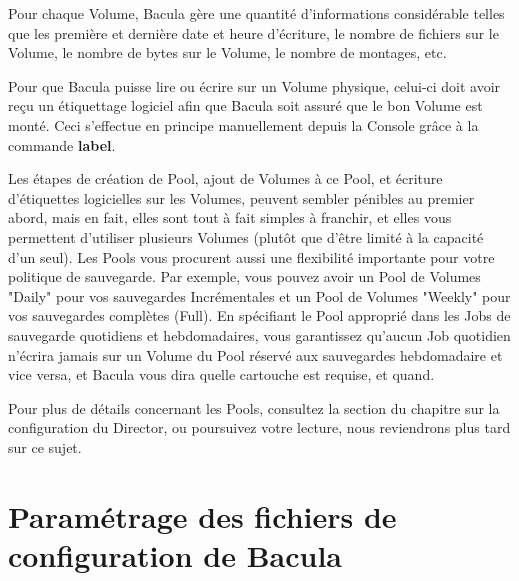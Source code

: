 Pour chaque Volume, Bacula g\`ere une quantit\'e d'informations consid\'erable
telles que les premi\`ere et derni\`ere date et heure d'\'ecriture, le nombre
de fichiers sur le Volume, le nombre de bytes sur le Volume, le nombre de
montages, etc. 

Pour que Bacula puisse lire ou \'ecrire sur un Volume physique, celui-ci doit
avoir re\c{c}u un \'etiquettage logiciel afin que Bacula soit assur\'e que le
bon Volume est mont\'e. Ceci s'effectue en principe manuellement depuis la
Console gr\^ace \`a la commande {\bf label}. 

Les \'etapes de cr\'eation de Pool, ajout de Volumes \`a ce Pool, et
\'ecriture d'\'etiquettes logicielles sur les Volumes, peuvent sembler
p\'enibles au premier abord, mais en fait, elles sont tout \`a fait simples
\`a franchir, et elles vous permettent d'utiliser plusieurs Volumes (plut\^ot
que d'\^etre limit\'e \`a la capacit\'e d'un seul). Les Pools vous procurent
aussi une flexibilit\'e importante pour votre politique de sauvegarde. Par
exemple, vous pouvez avoir un Pool de Volumes "Daily" pour vos sauvegardes
Incr\'ementales et un Pool de Volumes "Weekly" pour vos sauvegardes
compl\`etes (Full). En sp\'ecifiant le Pool appropri\'e dans les Jobs de
sauvegarde quotidiens et hebdomadaires, vous garantissez qu'aucun Job
quotidien n'\'ecrira jamais sur un Volume du Pool r\'eserv\'e aux sauvegardes
hebdomadaire et vice versa, et Bacula vous dira quelle cartouche est requise,
et quand. 

Pour plus de d\'etails concernant les Pools, consultez la section 
 du chapitre sur la
configuration du Director, ou poursuivez votre lecture, nous reviendrons plus
tard sur ce sujet. 

\section{Param\'etrage des fichiers de configuration de Bacula}
\label{config}

